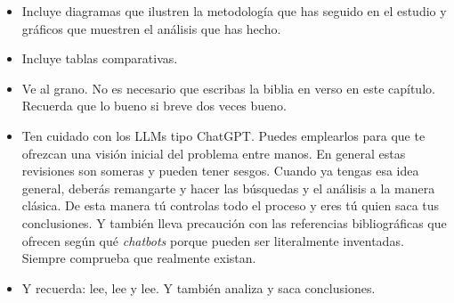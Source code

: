 \begin{itemize}
    \item Incluye diagramas que ilustren la metodología que has seguido en el estudio y gráficos que muestren el análisis que has hecho.
    \item Incluye tablas comparativas.
    \item Ve al grano. No es necesario que escribas la biblia en verso en este capítulo. Recuerda que lo bueno si breve dos veces bueno.
    \item Ten cuidado con los LLMs tipo ChatGPT. Puedes emplearlos para que te ofrezcan una visión inicial del problema entre manos. En general estas revisiones son someras y pueden tener sesgos. Cuando ya tengas esa idea general, deberás remangarte y hacer las búsquedas y el análisis a la manera clásica. De esta manera tú controlas todo el proceso y eres tú quien saca tus conclusiones. Y también lleva precaución con las referencias bibliográficas que ofrecen según qué \textit{chatbots} porque pueden ser literalmente inventadas. Siempre comprueba que realmente existan. 
    \item Y recuerda: lee, lee y lee. Y también analiza y saca conclusiones.
\end{itemize}

